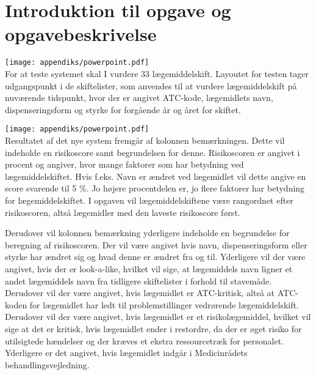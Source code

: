 \section{Introduktion til opgave og opgavebeskrivelse} \label{App:Intro_OPG}
\vspace{-0.3cm}
\texttt{[image: appendiks/powerpoint.pdf]} \\
For at teste systemet skal I vurdere 33 lægemiddelskift. Layoutet for testen tager udgangspunkt i de skiftelister, som anvendes til at vurdere lægemiddelskift på nuværende tidspunkt, hvor der er angivet ATC-kode, lægemidlets navn, dispenseringsform og styrke for forgående år og året for skiftet.

\texttt{[image: appendiks/powerpoint.pdf]} \\
Resultatet af det nye system fremgår af kolonnen bemærkningen. Dette vil indeholde en risikoscore samt begrundelsen for denne. Risikoscoren er angivet i procent og angiver, hvor mange faktorer som har betydning ved lægemiddelskiftet. Hvis f.eks. Navn er ændret ved lægemidlet vil dette angive en score svarende til 5 \%. Jo højere procentdelen er, jo flere faktorer har betydning for lægemiddelskiftet. I opgaven vil lægemiddelskiftene være rangordnet efter risikoscoren, altså lægemidler med den laveste risikoscore først.   

Derudover vil kolonnen bemærkning yderligere indeholde en begrundelse for beregning af risikoscoren. Der vil være angivet hvis navn, dispenseringsform eller styrke har ændret sig og hvad denne er ændret fra og til. Yderligere vil der være angivet, hvis der er look-a-like, hvilket vil sige, at lægemiddels navn ligner et andet lægemiddels navn fra tidligere skiftelister i forhold til stavemåde. Derudover vil der være angivet, hvis lægemidlet er ATC-kritisk, altså at ATC-koden for lægemidlet har ledt til problemstillinger vedrørende lægemiddelskift. Derudover vil der være angivet, hvis lægemidlet er et risikolægemiddel, hvilket vil sige at det er kritisk, hvis lægemidlet ender i restordre, da der er øget risiko for utilsigtede hændelser og der kræves et ekstra ressourcetræk for personalet. Yderligere er det angivet, hvis lægemidlet indgår i Medicinrådets behandlingsvejledning. 

